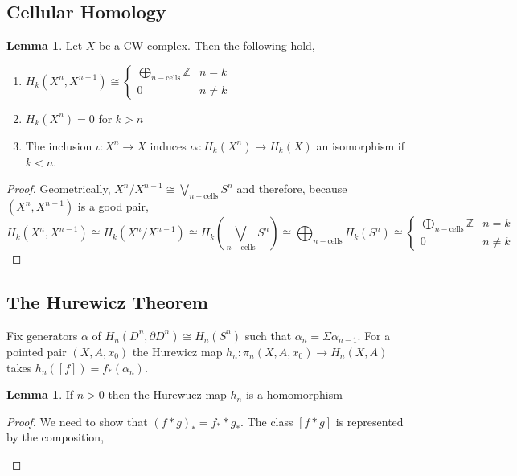 \documentclass[12pt]{extarticle}
\newcommand{\Z}{\mathbb{Z}}
\theoremstyle{definition}
\newtheorem{lemma}[theorem]{Lemma}
\newenvironment{definition}[1][Definition:]{\begin{trivlist}
\item[\hskip \labelsep {\bfseries #1}]}{\end{trivlist}}
\begin{document}
\subsection{Cellular Homology}

\begin{lemma}
Let $X$ be a CW complex. Then the following hold,
\begin{enumerate}
\item $H_k (X^n, X^{n-1}) \cong
\begin{cases}
\bigoplus_{n-\text{cells}} \Z & n = k \\
0 & n \neq k 
\end{cases} $

\item $H_k(X^n) = 0$ for $k > n$ 

\item The inclusion $\iota : X^n \to X$ induces $\iota_* : H_k(X^n) \to H_k(X)$ an isomorphism if $k < n$.
\end{enumerate}
\end{lemma}

\begin{proof}
Geometrically, $X^n / X^{n-1} \cong \bigvee_{n-\text{cells}} S^n$ and therefore, because $(X^n, X^{n-1})$ is a good pair,
\[ H_k (X^n, X^{n-1}) \cong H_k(X^n / X^{n-1}) \cong H_k \left( \bigvee_{n-\text{cells}} S^n \right) \cong \bigoplus_{n-\text{cells}} H_k(S^n) \cong
\begin{cases}
\bigoplus_{n-\text{cells}} \Z & n = k \\
0 & n \neq k 
\end{cases} \]
\end{proof}


\subsection{The Hurewicz Theorem}

\begin{definition}
Fix generators $\alpha$ of $H_n(D^n, \partial D^n) \cong H_n(S^n)$ such that $\alpha_n = \Sigma \alpha_{n-1}$. For a pointed pair $(X, A, x_0)$ the Hurewicz map $h_n : \pi_n(X, A, x_0) \to H_n(X, A)$ takes $h_n([f]) = f_*(\alpha_n)$. 
\end{definition}

\begin{lemma}
If $n > 0$ then the Hurewucz map $h_n$ is a homomorphism
\end{lemma}

\begin{proof}
We need to show that $(f * g)_* = f_* * g_*$. The class $[f * g]$ is represented by the composition,
\begin{center}
\end{center} 
\end{proof}
\end{document}

